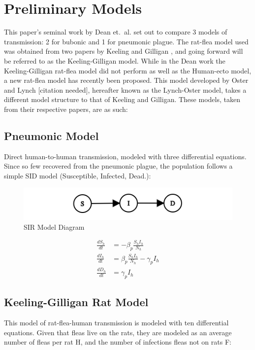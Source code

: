 \documentclass [letterpaper, 12pt] {article}
\begin{document}
%


\pagebreak

\section {Preliminary Models}
This paper's seminal work by Dean et.\ al. \cite{Dean1304} set out to compare 3 models of
transmission: 2 for bubonic and 1 for pneumonic plague. The rat-flea model used was obtained from two papers by Keeling and Gilligan \cite{keeling_gilligan_zoonosis} \cite{keeling2000}, and going forward will be referred to as the Keeling-Gilligan model. While in the Dean work the Keeling-Gilligan rat-flea model did not perform as well as the Human-ecto model, a new rat-flea model has recently been proposed. This model developed by Oster and Lynch [citation needed], hereafter known as the Lynch-Oster model, takes a different model structure to that of Keeling and Gilligan. These models, taken from their respective papers, are as such:

\subsection {Pneumonic Model}
Direct human-to-human transmission, modeled with three differential equations. Since so few recovered from the pneumonic plague, the population follows a simple SID model
(Susceptible, Infected, Dead.):

\begin{figure}[H]
	\centering
	\includegraphics[width=0.5\linewidth]{sid-graph.png}
	\caption{SIR Model Diagram}
\end{figure}


\begin{align}
	\frac{dS_h}{dt} &= - \beta_p \frac{S_h I_h}{N_h} \\
	\frac{dI_h}{dt} &= \beta_p \frac{S_h I_h}{N_h} - \gamma_p I_h \\
	\frac{dD_h}{dt} &= \gamma_p I_h
\end{align}


\subsection {Keeling-Gilligan Rat Model}
This model of rat-flea-human transmission is modeled with ten differential equations. Given that fleas live on the rats, they are modeled as an average number of fleas per rat H, and the number of infections fleas not on rats F:
\end{document}
